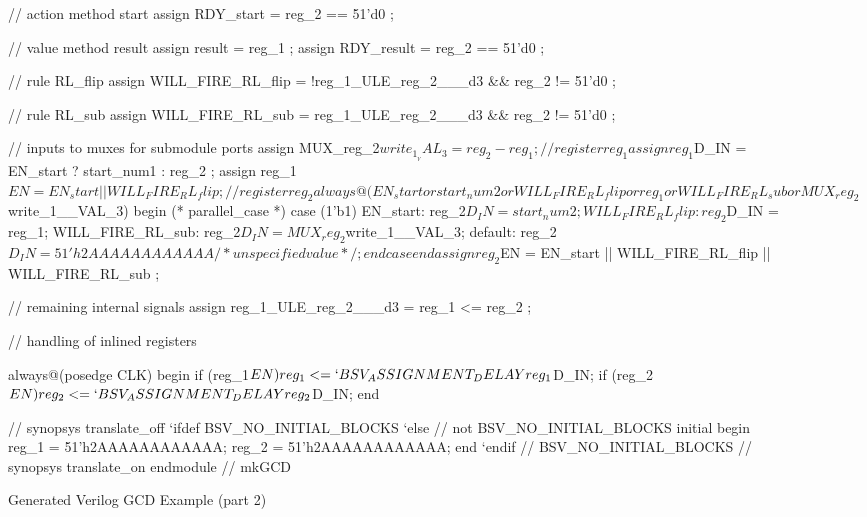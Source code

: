 \documentclass{article}
\newenvironment{libverbatim}
  {\small
   \verbatim}
  {\endverbatim
  }
\newenvironment{fminipage}[1][6 in]
  {\begin{lrbox}{\fminibox}\begin{minipage}[c]{6 in}}
  {\end{minipage}\end{lrbox}\fbox{\usebox{\fminibox}}}
\begin{document}
\begin{figure}
\begin{fminipage}
\begin{libverbatim}
 // action method start
  assign RDY_start = reg_2 == 51'd0 ;

  // value method result
  assign result = reg_1 ;
  assign RDY_result = reg_2 == 51'd0 ;

  // rule RL_flip
  assign WILL_FIRE_RL_flip = !reg_1_ULE_reg_2___d3 && reg_2 != 51'd0 ;

  // rule RL_sub
  assign WILL_FIRE_RL_sub = reg_1_ULE_reg_2___d3 && reg_2 != 51'd0 ;

  // inputs to muxes for submodule ports
  assign MUX_reg_2$write_1__VAL_3 = reg_2 - reg_1 ;

  // register reg_1
  assign reg_1$D_IN = EN_start ? start_num1 : reg_2 ;
  assign reg_1$EN = EN_start || WILL_FIRE_RL_flip ;

  // register reg_2
  always@(EN_start or
	  start_num2 or
	  WILL_FIRE_RL_flip or
	  reg_1 or WILL_FIRE_RL_sub or MUX_reg_2$write_1__VAL_3)
  begin
    (* parallel_case *) case (1'b1)
      EN_start: reg_2$D_IN = start_num2;
      WILL_FIRE_RL_flip: reg_2$D_IN = reg_1;
      WILL_FIRE_RL_sub: reg_2$D_IN = MUX_reg_2$write_1__VAL_3;
      default: reg_2$D_IN = 51'h2AAAAAAAAAAAA /* unspecified value */ ;
    endcase
  end
  assign reg_2$EN = EN_start || WILL_FIRE_RL_flip || WILL_FIRE_RL_sub ;

  // remaining internal signals
  assign reg_1_ULE_reg_2___d3 = reg_1 <= reg_2 ;

  // handling of inlined registers

  always@(posedge CLK)
  begin
    if (reg_1$EN) reg_1 <= `BSV_ASSIGNMENT_DELAY reg_1$D_IN;
    if (reg_2$EN) reg_2 <= `BSV_ASSIGNMENT_DELAY reg_2$D_IN;
  end

  // synopsys translate_off
  `ifdef BSV_NO_INITIAL_BLOCKS
  `else // not BSV_NO_INITIAL_BLOCKS
  initial
  begin
    reg_1 = 51'h2AAAAAAAAAAAA;
    reg_2 = 51'h2AAAAAAAAAAAA;
  end
  `endif // BSV_NO_INITIAL_BLOCKS
  // synopsys translate_on
endmodule  // mkGCD

\end{libverbatim}
\end{fminipage}
\caption{\label{gcd_v-fig2}Generated Verilog GCD Example (part 2)}
\end{figure}


\end{document}

